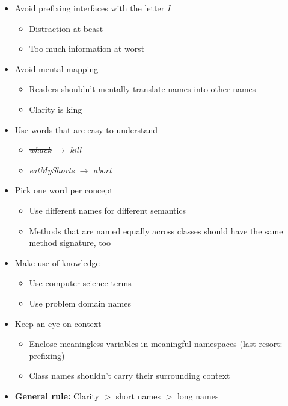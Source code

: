 \begin{itemize}
\begin{itemize}
    \end{itemize}
    \item Avoid prefixing interfaces with the letter \textit{I}
    \begin{itemize}
        \item Distraction at beast
        \item Too much information at worst
    \end{itemize}
    \item Avoid mental mapping
    \begin{itemize}
        \item Readers shouldn't mentally translate names into other names
        \item Clarity is king
    \end{itemize}
    \item Use words that are easy to understand
    \begin{itemize}
        \item \st{\textit{whack}} $\rightarrow$ \textit{kill}
        \item \st{\textit{eatMyShorts}} $\rightarrow$ \textit{abort}
    \end{itemize}
    \item Pick one word per concept
    \begin{itemize}
        \item Use different names for different semantics
        \item Methods that are named equally across classes should have the same method signature, too
    \end{itemize}
    \item Make use of knowledge
    \begin{itemize}
        \item Use computer science terms
        \item Use problem domain names
    \end{itemize}
    \item Keep an eye on context
    \begin{itemize}
        \item Enclose meaningless variables in meaningful namespaces (last resort: prefixing)
        \item Class names shouldn't carry their surrounding context
    \end{itemize}
    \item \textbf{General rule:} Clarity $>$ short names $>$ long names
\end{itemize}